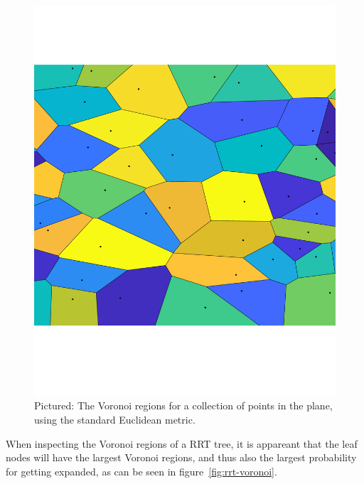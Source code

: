 \begin{figure}
  \includegraphics[scale=.3]{figures/rrt/voronoi-diagram}
  \caption{Pictured: The Voronoi regions for a collection of points in the plane,
    using the standard Euclidean metric.}
  \label{fig:voronoi-diagram}
\end{figure}

When inspecting the Voronoi regions of a \ac{RRT} tree, it is appareant that the
leaf nodes will have the largest Voronoi regions, and thus also the largest
probability for getting expanded, as can be seen in figure~\ref{fig:rrt-voronoi}.

